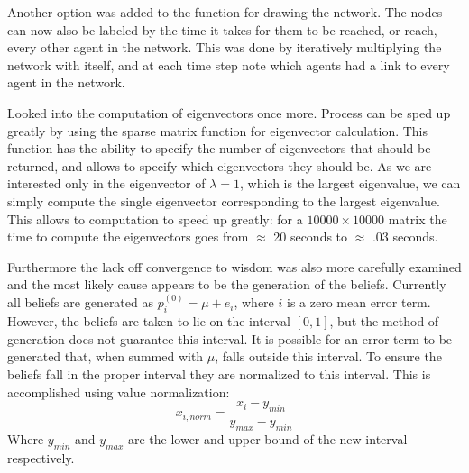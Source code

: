 \documentclass{article}
\begin{document}
Another option was added to the function for drawing the network. The nodes can now also be labeled by the time it takes for them to be reached, or reach, every other agent in the network. This was done by iteratively multiplying the network with itself, and at each time step note which agents had a link to every agent in the network.

Looked into the computation of eigenvectors once more. Process can be sped up greatly by using the sparse matrix function for eigenvector calculation. This function has the ability to specify the number of eigenvectors that should be returned, and allows to specify which eigenvectors they should be. As we are interested only in the eigenvector of $\lambda=1$, which is the largest eigenvalue, we can simply compute the single eigenvector corresponding to the largest eigenvalue. This allows to computation to speed up greatly: for a $10000\times 10000$ matrix the time to compute the eigenvectors goes from $\approx$ 20 seconds to $\approx$ .03 seconds.

Furthermore the lack off convergence to wisdom was also more carefully examined and the most likely cause appears to be the generation of the beliefs. Currently all beliefs are generated as $p_i^{(0)} = \mu + e_i$, where $i$ is a zero mean error term. However, the beliefs are taken to lie on the interval $[0, 1]$, but the method of generation does not guarantee this interval. It is possible for an error term to be generated that, when summed with $\mu$, falls outside this interval. To ensure the beliefs fall in the proper interval they are normalized to this interval. This is accomplished using value normalization:
\begin{equation}
    x_{i, norm} = \frac{x_i - y_{min}}{y_{max} - y_{min}}
\end{equation}
Where $ y_{min}$ and $y_{max}$ are the lower and upper bound of the new interval respectively.

\newpage
\end{document}
